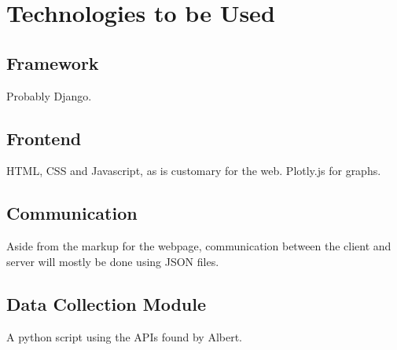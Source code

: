 \documentclass[a4paper,11pt]{article}
\begin{document}
\section{Technologies to be Used}
\subsection{Framework}
Probably Django.
\subsection{Frontend}
HTML, CSS and Javascript, as is customary for the web. Plotly.js for graphs.
\subsection{Communication}
Aside from the markup for the webpage, communication between the client and server will mostly be done using JSON files.
\subsection{Data Collection Module}
A python script using the APIs found by Albert.
\end{document}
